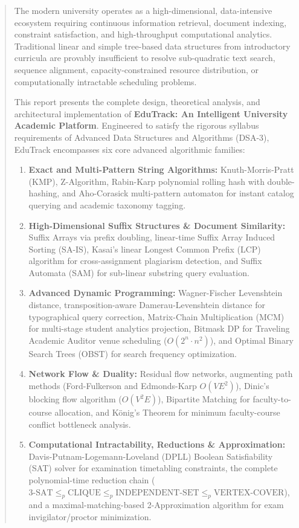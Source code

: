 \begin{abstract}
The modern university operates as a high-dimensional, data-intensive ecosystem requiring continuous information retrieval, document indexing, constraint satisfaction, and high-throughput computational analytics. Traditional linear and simple tree-based data structures from introductory curricula are provably insufficient to resolve sub-quadratic text search, sequence alignment, capacity-constrained resource distribution, or computationally intractable scheduling problems.

This report presents the complete design, theoretical analysis, and architectural implementation of \textbf{EduTrack: An Intelligent University Academic Platform}. Engineered to satisfy the rigorous syllabus requirements of Advanced Data Structures and Algorithms (DSA-3), EduTrack encompasses six core advanced algorithmic families:
\begin{enumerate}
    \item \textbf{Exact and Multi-Pattern String Algorithms:} Knuth-Morris-Pratt (KMP), Z-Algorithm, Rabin-Karp polynomial rolling hash with double-hashing, and Aho-Corasick multi-pattern automaton for instant catalog querying and academic taxonomy tagging.
    \item \textbf{High-Dimensional Suffix Structures \& Document Similarity:} Suffix Arrays via prefix doubling, linear-time Suffix Array Induced Sorting (SA-IS), Kasai's linear Longest Common Prefix (LCP) algorithm for cross-assignment plagiarism detection, and Suffix Automata (SAM) for sub-linear substring query evaluation.
    \item \textbf{Advanced Dynamic Programming:} Wagner-Fischer Levenshtein distance, transposition-aware Damerau-Levenshtein distance for typographical query correction, Matrix-Chain Multiplication (MCM) for multi-stage student analytics projection, Bitmask DP for Traveling Academic Auditor venue scheduling ($O(2^n \cdot n^2)$), and Optimal Binary Search Trees (OBST) for search frequency optimization.
    \item \textbf{Network Flow \& Duality:} Residual flow networks, augmenting path methods (Ford-Fulkerson and Edmonds-Karp $O(VE^2)$), Dinic's blocking flow algorithm ($O(V^2E)$), Bipartite Matching for faculty-to-course allocation, and König's Theorem for minimum faculty-course conflict bottleneck analysis.
    \item \textbf{Computational Intractability, Reductions \& Approximation:} Davis-Putnam-Logemann-Loveland (DPLL) Boolean Satisfiability (SAT) solver for examination timetabling constraints, the complete polynomial-time reduction chain ($\text{3-SAT} \le_p \text{CLIQUE} \le_p \text{INDEPENDENT-SET} \le_p \text{VERTEX-COVER}$), and a maximal-matching-based 2-Approximation algorithm for exam invigilator/proctor minimization.

\end{enumerate}
\end{abstract}
